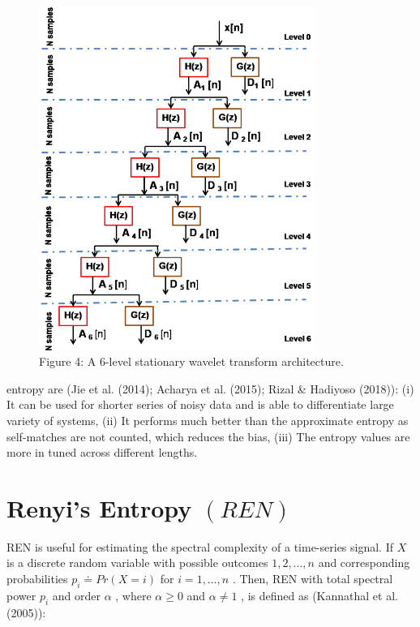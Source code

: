 \documentclass{article}
\begin{document}
\begin{figure}[htbp]
\centering
\includegraphics[width=0.8\textwidth]{images/bdc0ca10bcfc62f524c3777c4b29c1e9cf0fd8c2601ee9fd91c8da1eef1be617.jpg}
\caption{Figure 4: A 6-level stationary wavelet transform architecture.}
\end{figure}


entropy are (Jie et al. (2014); Acharya et al. (2015); Rizal & Hadiyoso (2018)): (i) It can be used for shorter series of noisy data and is able to differentiate large variety of systems, (ii) It performs much better than the approximate entropy as self-matches are not counted, which reduces the bias, (iii) The entropy values are more in tuned across different lengths.


\section{Renyi’s Entropy $(R E N)$}


REN is useful for estimating the spectral complexity of a time-series signal. If $X$ is a discrete random variable with possible outcomes $1,2,\ldots,n$ and corresponding probabilities $p_{i}\doteq P r(X=i)$ for $i=1,\ldots,n$ . Then, REN with total spectral power $p_{i}$ and order $\alpha$ , where $\alpha\geq0$ and $\alpha\neq1$ , is defined as (Kannathal et al. (2005)):
\end{document}

